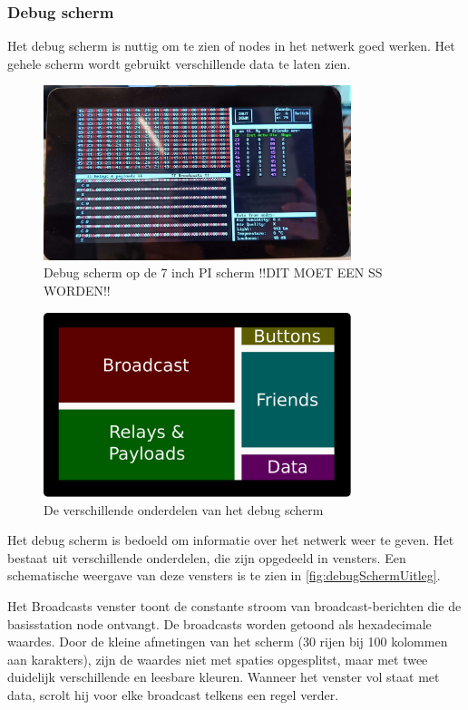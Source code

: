 \subsubsection*{Debug scherm}
Het debug scherm is nuttig om te zien of nodes in het netwerk goed werken. 
Het gehele scherm wordt gebruikt verschillende data te laten zien. 
\begin{figure}[ht]
    \centering
    \includegraphics*[width=0.8\textwidth]{img/debugScherm.jpg}
    \caption{Debug scherm op de 7 inch PI scherm !!DIT MOET EEN SS WORDEN!!}
    \label{fig:debugSchermScreenshot}
\end{figure}

\begin{figure}[ht]
    \centering
    \includegraphics*[width=0.8\textwidth]{img/debugScreenExplain.pdf}
    \caption{De verschillende onderdelen van het debug scherm}
    \label{fig:debugSchermUitleg}
\end{figure}
Het debug scherm is bedoeld om informatie over het netwerk weer te geven. Het bestaat uit verschillende onderdelen, die zijn opgedeeld in vensters. Een schematische weergave van deze vensters is te zien in \autoref{fig:debugSchermUitleg}.

Het Broadcasts venster toont de constante stroom van broadcast-berichten die de basisstation node ontvangt. De broadcasts worden getoond als hexadecimale waardes. Door de kleine afmetingen van het scherm (30 rijen bij 100 kolommen aan karakters), zijn de waardes niet met spaties opgesplitst, maar met twee duidelijk verschillende en leesbare kleuren. Wanneer het venster vol staat met data, scrolt hij voor elke broadcast telkens een regel verder.

